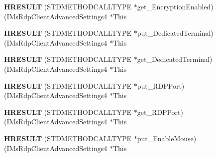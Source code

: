 \begin{DoxyCompactItemize}
\mbox{\label{struct_i_ms_rdp_client_advanced_settings4_vtbl_a44675f3fd559dfdc6a6ada4e949e1f1f}} 
{\bfseries H\+R\+E\+S\+U\+LT} (S\+T\+D\+M\+E\+T\+H\+O\+D\+C\+A\+L\+L\+T\+Y\+PE $\ast$get\+\_\+\+Encryption\+Enabled)(I\+Ms\+Rdp\+Client\+Advanced\+Settings4 $\ast$This
\item 
\mbox{\label{struct_i_ms_rdp_client_advanced_settings4_vtbl_a9d41ef43590b11a034488608df5c1977}} 
{\bfseries H\+R\+E\+S\+U\+LT} (S\+T\+D\+M\+E\+T\+H\+O\+D\+C\+A\+L\+L\+T\+Y\+PE $\ast$put\+\_\+\+Dedicated\+Terminal)(I\+Ms\+Rdp\+Client\+Advanced\+Settings4 $\ast$This
\item 
\mbox{\label{struct_i_ms_rdp_client_advanced_settings4_vtbl_a4e8dfbde60aa2f6056668abe664a898b}} 
{\bfseries H\+R\+E\+S\+U\+LT} (S\+T\+D\+M\+E\+T\+H\+O\+D\+C\+A\+L\+L\+T\+Y\+PE $\ast$get\+\_\+\+Dedicated\+Terminal)(I\+Ms\+Rdp\+Client\+Advanced\+Settings4 $\ast$This
\item 
\mbox{\label{struct_i_ms_rdp_client_advanced_settings4_vtbl_a708e47fa6c59dfe08657aaadff72a0e4}} 
{\bfseries H\+R\+E\+S\+U\+LT} (S\+T\+D\+M\+E\+T\+H\+O\+D\+C\+A\+L\+L\+T\+Y\+PE $\ast$put\+\_\+\+R\+D\+P\+Port)(I\+Ms\+Rdp\+Client\+Advanced\+Settings4 $\ast$This
\item 
\mbox{\label{struct_i_ms_rdp_client_advanced_settings4_vtbl_a9dceac1df2d54166ee85d1488028c010}} 
{\bfseries H\+R\+E\+S\+U\+LT} (S\+T\+D\+M\+E\+T\+H\+O\+D\+C\+A\+L\+L\+T\+Y\+PE $\ast$get\+\_\+\+R\+D\+P\+Port)(I\+Ms\+Rdp\+Client\+Advanced\+Settings4 $\ast$This
\item 
\mbox{\label{struct_i_ms_rdp_client_advanced_settings4_vtbl_aeefd52c86fbfd46c1ea3361cee4b075f}} 
{\bfseries H\+R\+E\+S\+U\+LT} (S\+T\+D\+M\+E\+T\+H\+O\+D\+C\+A\+L\+L\+T\+Y\+PE $\ast$put\+\_\+\+Enable\+Mouse)(I\+Ms\+Rdp\+Client\+Advanced\+Settings4 $\ast$This
\item 
\mbox{\label{struct_i_ms_rdp_client_advanced_settings4_vtbl_a400a5fcb065970bcc51a69e902e22c4b}} 

\end{DoxyCompactItemize}
